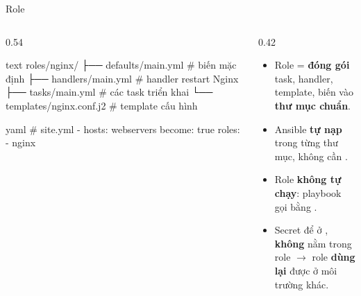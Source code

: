 \documentclass[aspectratio=169,11pt,xcolor=table]{beamer}
\begin{document}
\begin{frame}[fragile]{Role}
  \begin{columns}[c]
    \begin{column}{0.54\textwidth}
\begin{codeblock}[minted options={fontsize=\scriptsize}]{text}
roles/nginx/
├── defaults/main.yml       # biến mặc định
├── handlers/main.yml       # handler restart Nginx
├── tasks/main.yml          # các task triển khai
└── templates/nginx.conf.j2 # template cấu hình
\end{codeblock}
      \vspace{0.15cm}
\begin{codeblock}[minted options={fontsize=\scriptsize}]{yaml}
# site.yml
- hosts: webservers
  become: true
  roles:
    - nginx
\end{codeblock}
    \end{column}
    \begin{column}{0.42\textwidth}
      \begin{itemize}\setlength{\itemsep}{0.3cm}
        \item Role = \textbf{đóng gói} task, handler, template, biến vào
              \textbf{thư mục chuẩn}.
        \item Ansible \textbf{tự nạp}  trong từng thư mục,
              không cần .
        \item Role \textbf{không tự chạy}: playbook gọi bằng .
        \item Secret để ở , \textbf{không} nằm trong role
              $\rightarrow$ role \textbf{dùng lại} được ở môi trường khác.
      \end{itemize}
    \end{column}
  \end{columns}
\end{frame}
\end{document}
